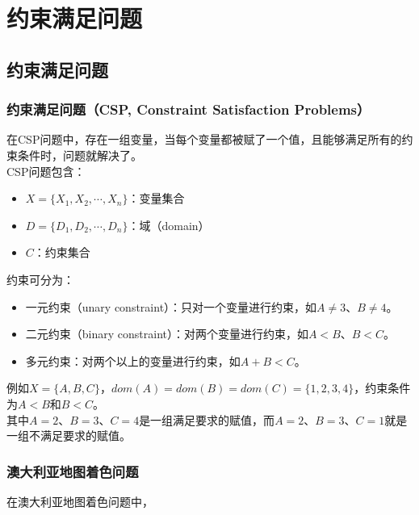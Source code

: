 \chapter{约束满足问题}

\section{约束满足问题}

\subsection{约束满足问题（CSP, Constraint Satisfaction Problems）}

在CSP问题中，存在一组变量，当每个变量都被赋了一个值，且能够满足所有的约束条件时，问题就解决了。\\

CSP问题包含：

\begin{itemize}
    \item $ X = \{X_1, X_2, \cdots, X_n\} $：变量集合
    \item $ D = \{D_1, D_2, \cdots, D_n\} $：域（domain）
    \item $ C $：约束集合
\end{itemize}

约束可分为：

\begin{itemize}
    \item 一元约束（unary constraint）：只对一个变量进行约束，如$ A \neq 3 $、$ B \neq 4 $。
    \item 二元约束（binary constraint）：对两个变量进行约束，如$ A < B $、$ B < C $。
    \item 多元约束：对两个以上的变量进行约束，如$ A + B < C $。
\end{itemize}

例如$ X = \{A, B, C\} $，$ dom(A) = dom(B) = dom(C) = \{1, 2, 3, 4\} $，约束条件为$ A < B $和$ B < C $。\\

其中$ A = 2 $、$ B = 3 $、$ C = 4 $是一组满足要求的赋值，而$ A = 2 $、$ B = 3 $、$ C = 1 $就是一组不满足要求的赋值。\\

\subsection{澳大利亚地图着色问题}

在澳大利亚地图着色问题中，

